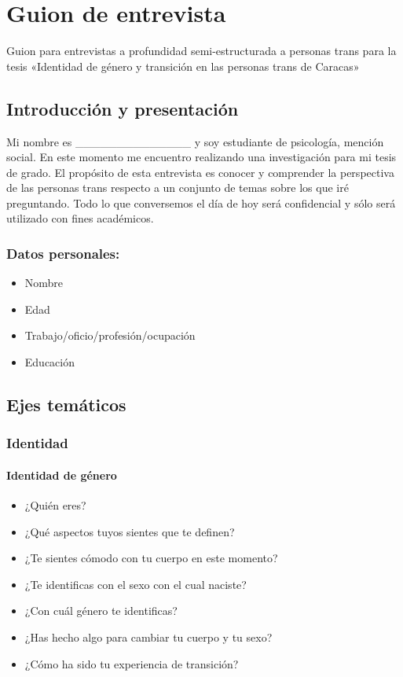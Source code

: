 \chapter{Guion de entrevista}\label{ch:guion}

Guion para entrevistas a profundidad semi-estructurada a personas trans
para la tesis «Identidad de género y transición en las personas trans de
Caracas»

\section{Introducción y presentación}

Mi nombre es \_\_\_\_\_\_\_\_\_\_\_\_\_\_ y soy estudiante de psicología,
mención social. En este momento me encuentro realizando una investigación
para mi tesis de grado.
El propósito de esta entrevista es conocer y comprender la perspectiva de
las personas trans respecto a un conjunto de temas sobre los que
iré preguntando.
Todo lo que conversemos el día de hoy será confidencial y sólo será utilizado
con fines académicos.

\subsection{Datos personales:}

\begin{itemize}
\item
  Nombre
\item
  Edad
\item
  Trabajo/oficio/profesión/ocupación
\item
  Educación
\end{itemize}

\section{Ejes temáticos}

	\subsection{Identidad}

		\subsubsection{Identidad de género}

\begin{itemize}
\item
  ¿Quién eres?
\item
  ¿Qué aspectos tuyos sientes que te definen?
\item
  ¿Te sientes cómodo con tu cuerpo en este momento?
\item
  ¿Te identificas con el sexo con el cual naciste?
\item
  ¿Con cuál género te identificas?
\item
  ¿Has hecho algo para cambiar tu cuerpo y tu sexo?
\item
  ¿Cómo ha sido tu experiencia de transición?
\end{itemize}

